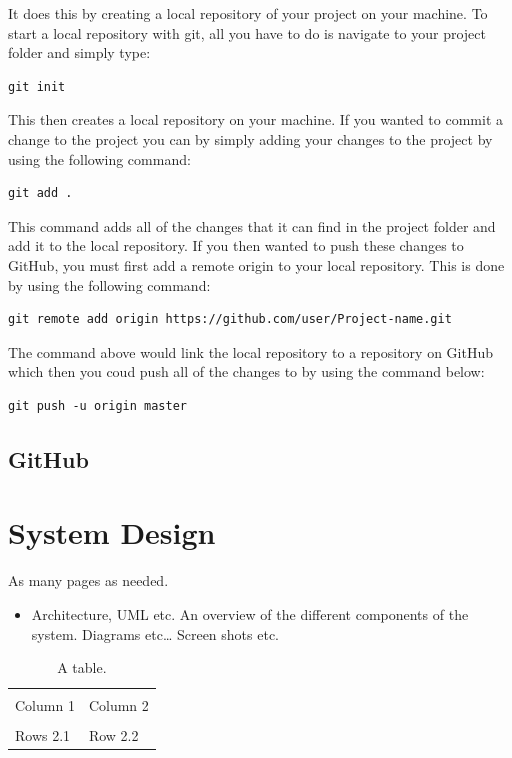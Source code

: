 It does this by creating a local repository of your project on your machine. To start a local repository with git, all you have to do is navigate to your project folder and simply type:

\begin{lstlisting}
git init
\end{lstlisting}

This then creates a local repository on your machine. If you wanted to commit a change to the project you can by simply adding your changes to the project by using the following command:

\begin{lstlisting}
git add .
\end{lstlisting}

This command adds all of the changes that it can find in the project folder and add it to the local repository. If you then wanted to push these changes to GitHub, you must first add a remote origin to your local repository. This is done by using the following command:

\begin{lstlisting}
git remote add origin https://github.com/user/Project-name.git
\end{lstlisting}

The command above would link the local repository to a repository on GitHub which then you coud push all of the changes to by using the command below:

\begin{lstlisting}
git push -u origin master
\end{lstlisting}


\section{GitHub}


\chapter{System Design}
As many pages as needed.
\begin{itemize}
\item Architecture, UML etc. An overview of the different components of the system. Diagrams etc… Screen shots etc.
\end{itemize}

\begin{table}[h]
  \centering
  \begin{tabular}{x{2cm}p{3cm}}
    \toprule \\
    Column 1 & Column 2 \\
    \midrule \\
    Rows 2.1 & Row 2.2 \\
    \bottomrule
  \end{tabular}
  \caption{A table.}
  \label{table:mytable}
\end{table}

